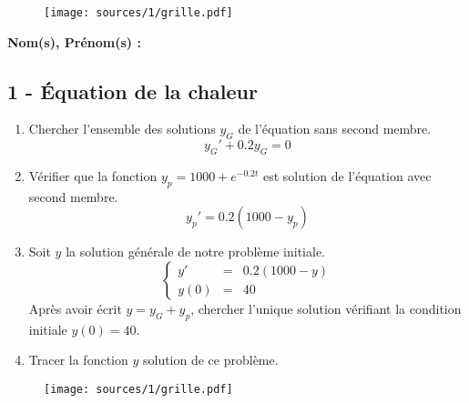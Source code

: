 \documentclass[12pt]{article}
\begin{document}
\begin{figure}[H]
  \centering
  \texttt{[image: sources/1/grille.pdf]}
\end{figure}

\newpage

\textbf{Nom(s), Prénom(s) :}

\subsection*{1 - Équation de la chaleur}



\begin{enumerate}
\item Chercher l'ensemble des solutions $y_G$ de l'équation sans second membre.
  $$ y_G' + 0.2y_G = 0 $$
\item Vérifier que la fonction $y_p = 1000 + e^{-0.2t}$ est solution de l'équation avec second membre. 
  $$ y_p' = 0.2(1000 - y_p) $$
\item Soit $y$ la solution générale de notre problème initiale.
  \begin{equation*}
    \left\lbrace
    \begin{array}{ccc}
      y'   &=& 0.2(1000 - y)\\
      y(0) &=& 40
    \end{array}\right.
  \end{equation*}
  Après avoir écrit $y = y_G + y_p$, chercher l'unique solution vérifiant la condition initiale $y(0) = 40$. 
\item Tracer la fonction $y$ solution de ce problème.
\end{enumerate}

\begin{figure}[H]
  \centering
  \texttt{[image: sources/1/grille.pdf]}
\end{figure}
\end{document}
